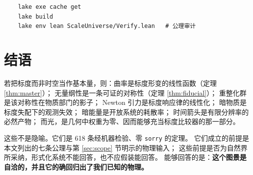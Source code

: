 \documentclass[11pt,a4paper]{article}
\theoremstyle{sudef}
\begin{document}
\begin{verbatim}
    lake exe cache get
    lake build
    lake env lean ScaleUniverse/Verify.lean   # 公理审计
\end{verbatim}

\section{结语}

若把标度而非时空当作基本量，则：曲率是标度形变的线性函数（定理 \ref{thm:master}）；
无量纲性是一条可证的对称性（定理 \ref{thm:fiducial}）；
重整化群是该对称性在物质部门的影子；
Newton 引力是标度响应律的线性化；
暗物质是标度失配下的观测失效；
暗能量是开放系统的耗散率；
时间箭头是有限分辨率的必然产物；
而光，是几何中权重为零、因而能够充当标度比较器的那一部分。

这些不是隐喻。它们是 618 条经机器检验、零 \texttt{sorry} 的定理。
它们成立的前提是本文列出的七条公理与第 \ref{sec:scope} 节明示的物理输入；
这些前提是否为自然界所采纳，形式化系统不能回答，也不应假装能回答。
能够回答的是：\textbf{这个图景是自洽的，并且它的确回归出了我们已知的物理。}
\end{document}
